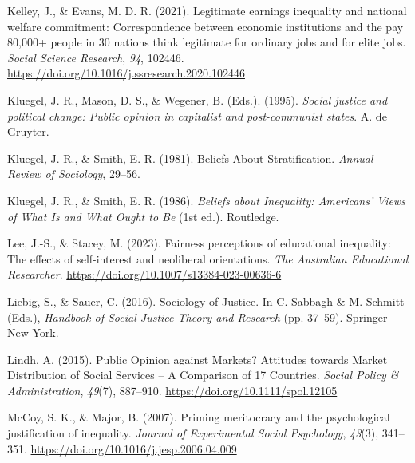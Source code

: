\documentclass[
  12pt,
  a4paper,
]{article}
\newlength{\cslhangindent}
\newlength{\cslentryspacingunit} %
\newenvironment{CSLReferences}[2] %
 {%
  \setlength{\parindent}{0pt}
  \ifodd #1
  \let\oldpar\par
  \def\par{\hangindent=\cslhangindent\oldpar}
  \fi
  \setlength{\parskip}{#2\cslentryspacingunit}
 }%
 {}
\begin{document}
\begin{CSLReferences}{1}{0}
\leavevmode{}%
Kelley, J., \& Evans, M. D. R. (2021). Legitimate earnings inequality
and national welfare commitment: {Correspondence} between economic
institutions and the pay 80,000+ people in 30 nations think legitimate
for ordinary jobs and for elite jobs. \emph{Social Science Research},
\emph{94}, 102446.
\url{https://doi.org/10.1016/j.ssresearch.2020.102446}

\leavevmode{}%
Kluegel, J. R., Mason, D. S., \& Wegener, B. (Eds.). (1995).
\emph{Social justice and political change: Public opinion in capitalist
and post-communist states}. A. de Gruyter.

\leavevmode{}%
Kluegel, J. R., \& Smith, E. R. (1981). Beliefs {About Stratification}.
\emph{Annual Review of Sociology}, 29--56.

\leavevmode{}%
Kluegel, J. R., \& Smith, E. R. (1986). \emph{Beliefs about
{Inequality}: {Americans}' {Views} of {What Is} and {What Ought} to
{Be}} (1st ed.). Routledge.

\leavevmode{}%
Lee, J.-S., \& Stacey, M. (2023). Fairness perceptions of educational
inequality: The effects of self-interest and neoliberal orientations.
\emph{The Australian Educational Researcher}.
\url{https://doi.org/10.1007/s13384-023-00636-6}

\leavevmode{}%
Liebig, S., \& Sauer, C. (2016). Sociology of {Justice}. In C. Sabbagh
\& M. Schmitt (Eds.), \emph{Handbook of {Social Justice Theory} and
{Research}} (pp. 37--59). Springer New York.

\leavevmode{}%
Lindh, A. (2015). Public {Opinion} against {Markets}? {Attitudes}
towards {Market Distribution} of {Social Services} -- {A Comparison} of
17 {Countries}. \emph{Social Policy \& Administration}, \emph{49}(7),
887--910. \url{https://doi.org/10.1111/spol.12105}

\leavevmode{}%
McCoy, S. K., \& Major, B. (2007). Priming meritocracy and the
psychological justification of inequality. \emph{Journal of Experimental
Social Psychology}, \emph{43}(3), 341--351.
\url{https://doi.org/10.1016/j.jesp.2006.04.009}


\end{CSLReferences}
\end{document}
